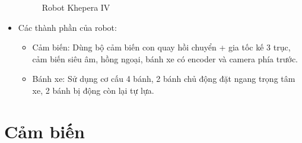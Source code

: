 \begin{itemize}
\begin{figure}[H]
\begin{subfigure}{0.6\textwidth}
            \end{subfigure}
            \caption{Robot Khepera IV}
            \label{chap1_pic14}
        \end{figure}
        \item Các thành phần của robot:
            \begin{itemize}[label=\textendash]
                \item Cảm biến: Dùng bộ cảm biến con quay hồi chuyển + gia tốc kế 3 trục, cảm biến siêu âm, hồng ngoại, bánh xe có encoder và camera phía trước.
                \item Bánh xe: Sử dụng cơ cấu 4 bánh, 2 bánh chủ động đặt ngang trọng tâm xe, 2 bánh bị động còn lại tự lựa.
            \end{itemize}
    \end{itemize}






    \section{Cảm biến}
